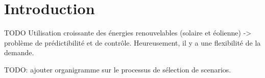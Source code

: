 \chapter{Introduction}
\vspace*{1.2cm}

TODO Utilisation croissante des énergies renouvelables (solaire et éolienne) 
-> problème de prédictibilité et de contrôle. 
Heureusement, il y a une flexibilité de la demande.

TODO: ajouter organigramme sur le processus de sélection de scenarios.